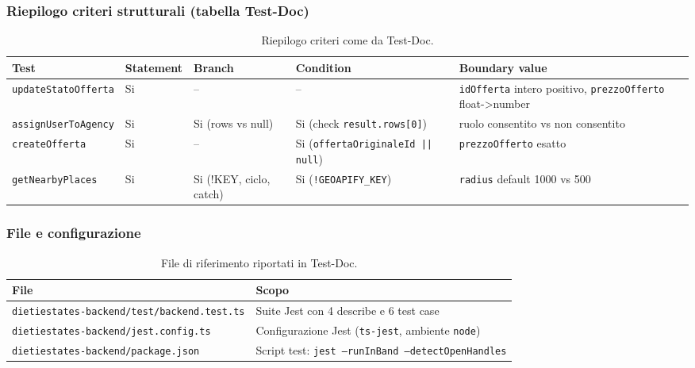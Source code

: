\documentclass[a4paper,11pt]{article}
\begin{document}
\subsubsection{Riepilogo criteri strutturali (tabella Test-Doc)}
\begin{table}[H]
\centering
\small
\begin{tabular}{@{}p{}p{}p{}p{}p{}@{}}
\toprule
Test & Statement & Branch & Condition & Boundary value \\
\midrule
\texttt{updateStatoOfferta} & Si & -- & -- & \texttt{idOfferta} intero positivo, \texttt{prezzoOfferto} float->number \\
\texttt{assignUserToAgency} & Si & Si (rows vs null) & Si (check \texttt{result.rows[0]}) & ruolo consentito vs non consentito \\
\texttt{createOfferta} & Si & -- & Si (\texttt{offertaOriginaleId || null}) & \texttt{prezzoOfferto} esatto \\
\texttt{getNearbyPlaces} & Si & Si (!KEY, ciclo, catch) & Si (\texttt{!GEOAPIFY\_KEY}) & \texttt{radius} default 1000 vs 500 \\
\bottomrule
\end{tabular}
\caption{Riepilogo criteri come da Test-Doc.}
\label{tab:testdoc-criteri}
\end{table}

\subsubsection{File e configurazione}
\begin{table}[H]
\centering
\small
\begin{tabular}{@{}p{}p{}@{}}
\toprule
File & Scopo \\
\midrule
\texttt{dietiestates-backend/test/backend.test.ts} & Suite Jest con 4 describe e 6 test case \\
\texttt{dietiestates-backend/jest.config.ts} & Configurazione Jest (\texttt{ts-jest}, ambiente \texttt{node}) \\
\texttt{dietiestates-backend/package.json} & Script test: \texttt{jest --runInBand --detectOpenHandles} \\
\bottomrule
\end{tabular}
\caption{File di riferimento riportati in Test-Doc.}
\label{tab:testdoc-file-config}
\end{table}
\end{document}
